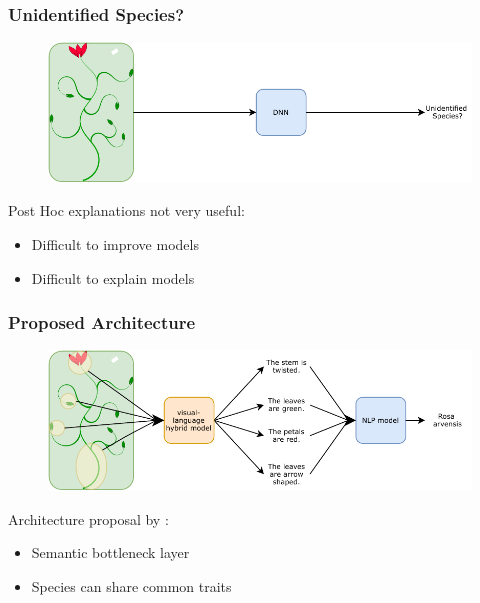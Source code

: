 \documentclass{beamer}
\begin{document}
\begin{frame}
\frametitle{Unidentified Species?}
\begin{figure} [htbp]
    \centering
    \includegraphics[width=\textwidth]{figures/midterm_explain_3.pdf}
\end{figure}
Post Hoc explanations not very useful:
\begin{itemize}
    \item Difficult to improve models
    \item Difficult to explain models
\end{itemize}
\end{frame}


\begin{frame}
\frametitle{Proposed Architecture}
\begin{figure} [htbp]
    \centering
    \includegraphics[width=\textwidth]{figures/architecture.pdf}
\end{figure}
Architecture proposal by \textcite{ishikawa_contextual_2021}:
\begin{itemize}
    \item Semantic bottleneck layer
    \item Species can share common traits
\end{itemize}
\end{frame}
\end{document}
